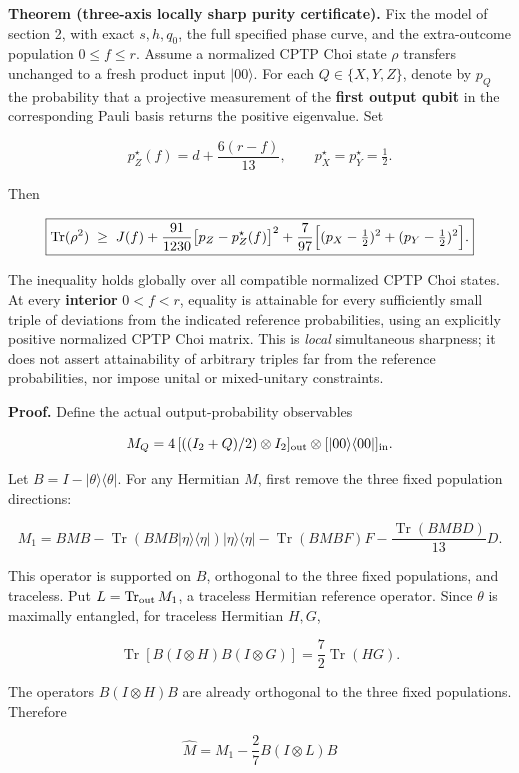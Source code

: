 \documentclass[
  10pt,
  a4paper,
]{article}
\begin{document}
\textbf{Theorem (three-axis locally sharp purity certificate).} Fix the model of section 2, with exact \(s,h,q_0\), the full specified phase curve, and the extra-outcome population \(0\le f\le r\). Assume a normalized CPTP Choi state \(\rho\) transfers unchanged to a fresh product input \(|00\rangle\). For each \(Q\in\{X,Y,Z\}\), denote by \(p_Q\) the probability that a projective measurement of the \textbf{first output qubit} in the corresponding Pauli basis returns the positive eigenvalue. Set

\[
 p_Z^{\star}(f)=d+\frac{6(r-f)}{13},\qquad
 p_X^\star=p_Y^\star=\tfrac12.
\]

Then

\[
\boxed{
 \operatorname{Tr}(\rho^2)\;\ge\;J(f)
 +\frac{91}{1230}\bigl[p_Z-p_Z^\star(f)\bigr]^2
 +\frac{7}{97}\Bigl[(p_X-\tfrac12)^2+(p_Y-\tfrac12)^2\Bigr].}
\]

The inequality holds globally over all compatible normalized CPTP Choi states. At every \textbf{interior} \(0<f<r\), equality is attainable for every sufficiently small triple of deviations from the indicated reference probabilities, using an explicitly positive normalized CPTP Choi matrix. This is \emph{local} simultaneous sharpness; it does not assert attainability of arbitrary triples far from the reference probabilities, nor impose unital or mixed-unitary constraints.

\textbf{Proof.} Define the actual output-probability observables

\[
M_Q=4\,[((I_2+Q)/2)\otimes I_2]_{\rm out}\otimes[|00\rangle\langle00|]_{\rm in}.
\]

Let \(B=I-|\theta\rangle\langle\theta|\). For any Hermitian \(M\), first remove the three fixed population directions:

\[
M_1=BMB
 -\operatorname{Tr}(BMB|\eta\rangle\langle\eta|)|\eta\rangle\langle\eta|
 -\operatorname{Tr}(BMBF)F
 -\frac{\operatorname{Tr}(BMB D)}{13}D.
\]

This operator is supported on \(B\), orthogonal to the three fixed populations, and traceless. Put \(L=\operatorname{Tr}_{\rm out}M_1\), a traceless Hermitian reference operator. Since \(\theta\) is maximally entangled, for traceless Hermitian \(H,G\),

\[
\operatorname{Tr}[B(I\otimes H)B(I\otimes G)]
 =\frac72\operatorname{Tr}(HG).
\]

The operators \(B(I\otimes H)B\) are already orthogonal to the three fixed populations. Therefore

\[
\widehat M=M_1-\frac27 B(I\otimes L)B
\]
\end{document}
